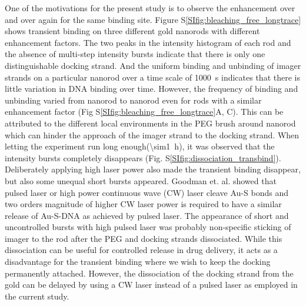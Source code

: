 One of the motivations for the present study is to observe the enhancement over and over again for the same binding site.
Figure S\ref{SIfig:bleaching_free_longtrace} shows transient binding on three different gold nanorods with different enhancement factors.
The two peaks in the intensity histogram of each rod and the absence of multi-step intensity bursts indicate that there is only one distinguishable docking strand.
And the uniform binding and unbinding of imager strands on a particular nanorod over a time scale of \SI{1000}{\s} indicates that there is little variation in DNA binding over time.
However, the frequency of binding and unbinding varied from nanorod to nanorod even for rods with a similar enhancement factor (Fig S\ref{SIfig:bleaching_free_longtrace}A, C).
This can be attributed to the different local environments in the PEG brush around nanorod which can hinder the approach of the imager strand to the docking strand.
When letting the experiment run long enough(\SI{\sim1}{\hour}), it was observed that the intensity bursts completely disappears (Fig. S\ref{SIfig:dissociation_transbind}).
Deliberately applying high laser power also made the transient binding disappear, but also some unequal short bursts appeared.
Goodman et. al.\cite{goodman2016understanding} showed that pulsed laser or high power continuous wave (CW) laser cleave Au-S bonds and two orders magnitude of higher CW laser power is required to have a similar release of Au-S-DNA as achieved by pulsed laser.
The appearance of short and uncontrolled bursts with high pulsed laser was probably non-specific sticking of imager to the rod after the PEG and docking strands dissociated.
While this dissociation can be useful for controlled release in drug delivery, it acts as a disadvantage for the transient binding where we wish to keep the docking permanently attached.
However, the dissociation of the docking strand from the gold can be delayed by using a CW laser instead of a pulsed laser as employed in the current study.

